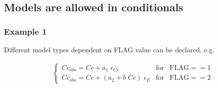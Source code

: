 \subsection{Models are allowed in conditionals}

\subsubsection*{Example 1}
Different model types dependent on FLAG value can be declared, e.g.

\begin{eqnarray}
&& \left\{ \begin{array}{lcl}  Cc_{obs} = Cc + a_1 \;\epsilon_{Cc}  & \mbox{for} & \mbox{FLAG}  == 1	 \\
Cc_{obs} = Cc + (a_2 + b\;Cc) \;\epsilon_{E} & \mbox{for} & \mbox{FLAG} == 2 \nonumber
\end{array}\right.
\end{eqnarray}



